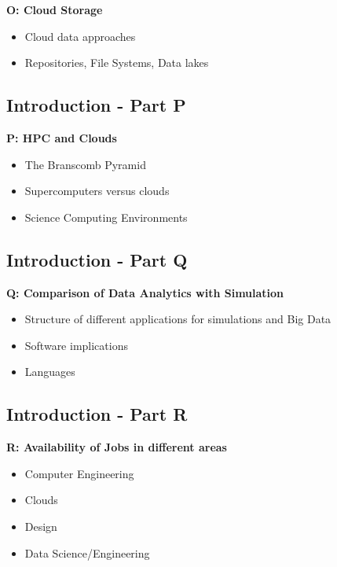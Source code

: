 \textbf{O: Cloud Storage}
\begin{itemize}
\item Cloud data approaches
\item Repositories, File Systems, Data lakes
\end{itemize} 

\subsection{Introduction - Part P}\label{s:cloud-fundamentals-p}

\textbf{P: HPC and Clouds}
\begin{itemize}
\item The Branscomb Pyramid
\item Supercomputers versus clouds
\item Science Computing Environments
\end{itemize} 

\subsection{Introduction - Part Q}\label{s:cloud-fundamentals-q}

\textbf{Q: Comparison of Data Analytics with Simulation}
\begin{itemize}
\item Structure of different applications for simulations and Big Data
\item Software implications
\item Languages
\end{itemize}  

\subsection{Introduction - Part R}\label{s:cloud-fundamentals-r}

\textbf{R: Availability of Jobs in different areas}
\begin{itemize}
\item Computer Engineering
\item Clouds
\item Design
\item Data Science/Engineering
\end{itemize} 

